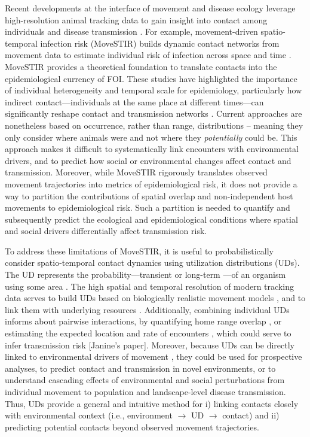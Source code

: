 \documentclass[letterpaper]{article}
\begin{document}

Recent developments at the interface of movement and disease ecology leverage high-resolution animal tracking data to gain insight into contact among individuals and disease transmission \citep{Richardson2015,Wilber2022,Yang2023}. For example, movement-driven spatio-temporal infection risk (MoveSTIR) builds dynamic contact networks from movement data to estimate individual risk of infection across space and time \citep{Wilber2022}. MoveSTIR provides a theoretical foundation to translate contacts into the epidemiological currency of FOI. These studies have highlighted the importance of individual heterogeneity and temporal scale for epidemiology, particularly how indirect contact---individuals at the same place at different times---can significantly reshape contact and transmission networks \citep{Richardson2015,Yang2023}. Current approaches are nonetheless based on occurrence, rather than range, distributions \citep[in the terminology of ][]{Alston2022} -- meaning they only consider where animals were and not where they \emph{potentially} could be. This approach makes it difficult to systematically link encounters with environmental drivers, and to predict how social or environmental changes affect contact and transmission.  Moreover, while MoveSTIR rigorously translates observed movement trajectories into metrics of epidemiological risk, it does not provide a way to partition the contributions of spatial overlap and non-independent host movements to epidemiological risk. Such a partition is needed to quantify and subsequently predict the ecological and epidemiological conditions where spatial and social drivers differentially affect transmission risk.

To address these limitations of MoveSTIR, it is useful to probabilistically consider spatio-temporal contact dynamics using utilization distributions (UDs). The UD represents the probability---transient or long-term \citep{Tao2016}---of an organism using some area \citep{Worton1989}. The high spatial and temporal resolution of modern tracking data serves to build UDs based on biologically realistic movement models \citep{Kranstauber2012,Fleming2014}, and to link them with underlying resources \citep{Potts2023}.
Additionally, combining individual UDs informs about pairwise interactions, by quantifying home range overlap \citep{Winner2018}, or estimating the expected location and rate of encounters \citep{Noonan2021}, which could serve to infer transmission risk \citep{Godfrey2010,Godfrey2013,Noonan2021} [Janine's paper]. 
Moreover, because UDs can be directly linked to environmental drivers of movement \citep{Signer2017}, they could be used for prospective analyses, to predict contact and transmission in novel environments, or to understand cascading effects of environmental and social perturbations from individual movement to population and landscape-level disease transmission.  Thus, UDs provide a general and intuitive method for i) linking contacts closely with environmental context (i.e., environment $\rightarrow$ UD $\rightarrow$ contact) and ii) predicting potential contacts beyond observed movement trajectories.
\end{document}
